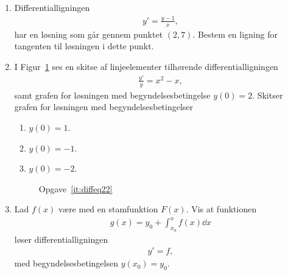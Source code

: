 \begin{enumerate}
	
	\item Differentialligningen
	\begin{align*}
	y'=\frac{y-1}{x},
	\end{align*}
	har en løsning som går gennem punktet $(2,7)$. Bestem en ligning for tangenten til løsningen i dette punkt.
	
	\item \label{it:diffeq22}	 I Figur~\ref{fig:diffeq22} ses en skitse af linjeelementer tilhørende differentialligningen
	\begin{align*}
	\frac{y'}{y}=x^2-x,
	\end{align*}
	samt grafen for løsningen med begyndelsesbetingelse $y(0)=2$. Skitser grafen for løsningen med begyndelsesbetingelser
	\begin{enumerate}
		\item $y(0)=1$.
		\item $y(0)=-1$.
		\item $y(0)=-2$.
	\end{enumerate}
	
	
	\begin{figure}
		\centering
		\caption{Opgave~\ref{it:diffeq22}}
		\label{fig:diffeq22}
	\end{figure}
	
	
	
	\item Lad $f(x)$ være med en stamfunktion $F(x)$. Vis at funktionen 
	\begin{align*}
	g(x)=y_0+\int_{x_0}^x f(x)\dd x
	\end{align*}
	løser differentialligningen 
	\begin{align*}
	y'=f,
	\end{align*}
	med begyndelsesbetingelsen $y(x_0)=y_0$.
	
	
	
	
	
	
	
	
	
\end{enumerate}